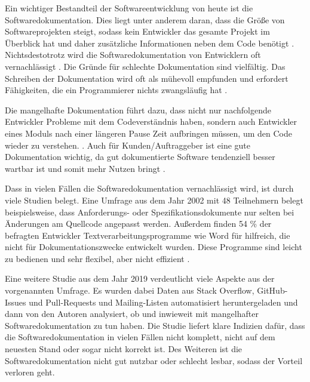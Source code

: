 \label{sec:introduction}

Ein wichtiger Bestandteil der Softwareentwicklung von heute ist die Softwaredokumentation. Dies liegt unter anderem daran, dass die Größe von Softwareprojekten steigt, sodass kein Entwickler das gesamte Projekt im Überblick hat und daher zusätzliche Informationen neben dem Code benötigt \cite[S. 1]{StaticAnalysis:AnIntroduction:TheFundamentalChallengeofSoftwareEngineeringisOneofComplexity.}. Nichtsdestotrotz wird die Softwaredokumentation von Entwicklern oft vernachlässigt \cite[S. 83]{Qualityanalysisofsourcecodecomments}.  Die Gründe für schlechte Dokumentation sind vielfältig. Das Schreiben der Dokumentation wird oft als mühevoll empfunden und erfordert Fähigkeiten, die ein Programmierer nichts zwangsläufig hat\cite[S. 70]{AutomaticQualityAssessmentofSourceCodeComments:TheJavadocMiner} \cite[S. 593]{Softwareengineeringandsoftwaredocumentation:aunifiedlongcourse}.  

Die mangelhafte Dokumentation führt dazu, dass nicht nur nachfolgende Entwickler Probleme mit dem Codeverständnis haben, sondern auch Entwickler eines Moduls nach einer längeren Pause Zeit aufbringen müssen, um den Code wieder zu verstehen. \cite[S. 511]{vestdam}. Auch für Kunden/Auftraggeber ist eine gute Dokumentation wichtig, da gut dokumentierte Software tendenziell besser wartbar ist und somit mehr Nutzen bringt \cite[S. 83]{Qualityanalysisofsourcecodecomments}\cite[S. 1]{SoftwareDocumentationManagementIssuesandPractices:ASurvey}.


Dass in vielen Fällen die Softwaredokumentation vernachlässigt wird, ist durch viele Studien belegt. Eine Umfrage aus dem Jahr 2002 mit 48 Teilnehmern belegt beispielsweise, dass Anforderungs- oder Spezifikationsdokumente nur selten bei Änderungen am Quellcode angepasst werden. Außerdem finden 54 \% der befragten Entwickler  Textverarbeitungsprogramme wie Word für hilfreich, die nicht für Dokumentationszwecke entwickelt wurden. Diese Programme sind leicht zu bedienen und sehr flexibel, aber nicht effizient  \cite[S. 28-29]{TheRelevanceofSoftwareDocumentationToolsandTechnologies:ASurvey}. 

Eine weitere Studie aus dem Jahr 2019 verdeutlicht viele Aspekte aus der vorgenannten Umfrage. Es wurden dabei Daten aus Stack Overflow, GitHub-Issues und Pull-Requests und Mailing-Listen automatisiert heruntergeladen und dann von den Autoren analysiert, ob und inwieweit mit mangelhafter Softwaredokumentation zu tun haben.  Die Studie liefert klare Indizien dafür, dass die Softwaredokumentation in vielen Fällen nicht komplett, nicht auf dem neuesten Stand oder sogar nicht korrekt ist. Des Weiteren ist die Softwaredokumentation nicht gut nutzbar oder schlecht lesbar, sodass der Vorteil verloren geht\cite[S. 1201-1204]{SoftwareDocumentationIssuesUnveiled}.







